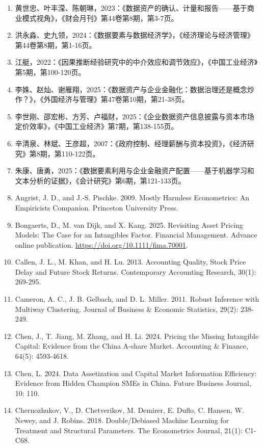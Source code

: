 \begin{enumerate}
\def\labelenumi{\arabic{enumi}.}
\tightlist
\item
  黄世忠、叶丰滢、陈朝琳，2023：《数据资产的确认、计量和报告------基于商业模式视角》，《财会月刊》第44卷第8期，第3-7页。
\item
  洪永淼、史九领，2024：《数据要素与数据经济学》，《经济理论与经济管理》第44卷第8期，第1-16页。
\item
  江艇，2022：《因果推断经验研究中的中介效应和调节效应》，《中国工业经济》第5期，第100-120页。
\item
  李姝、赵灿、谢雁翔，2025：《数据资产与企业金融化：数据治理还是概念炒作？》，《外国经济与管理》第47卷第10期，第21-38页。
\item
  李世刚、邵宏彬、方芳、卢福财，2025：《企业数据资产信息披露与资本市场定价效率》，《中国工业经济》第7期，第138-155页。
\item
  辛清泉、林斌、王彦超，2007：《政府控制、经理薪酬与资本投资》，《经济研究》第8期，第110-122页。
\item
  朱康、唐勇，2025：《数据要素利用与企业金融资产配置------基于机器学习和文本分析的证据》，《会计研究》第6期，第121-133页。
\item
  Angrist, J. D., and J.-S. Pischke. 2009. Mostly Harmless Econometrics: An Empiricist\textquotesingle s Companion. Princeton University Press.
\item
  Bongaerts, D., M. van Dijk, and X. Kang. 2025. Revisiting Asset Pricing Models: The Case for an Intangibles Factor. Financial Management. Advance online publication. \url{https://doi.org/10.1111/fima.70001}.
\item
  Callen, J. L., M. Khan, and H. Lu. 2013. Accounting Quality, Stock Price Delay and Future Stock Returns. Contemporary Accounting Research, 30(1): 269-295.
\item
  Cameron, A. C., J. B. Gelbach, and D. L. Miller. 2011. Robust Inference with Multiway Clustering. Journal of Business \& Economic Statistics, 29(2): 238-249.
\item
  Chen, J., T. Jiang, M. Zhang, and H. Li. 2024. Pricing the Missing Intangible Capital: Evidence from the China A-share Market. Accounting \& Finance, 64(5): 4593-4618.
\item
  Chen, L. 2024. Data Assetization and Capital Market Information Efficiency: Evidence from Hidden Champion SMEs in China. Future Business Journal, 10: 110.
\item
  Chernozhukov, V., D. Chetverikov, M. Demirer, E. Duflo, C. Hansen, W. Newey, and J. Robins. 2018. Double/Debiased Machine Learning for Treatment and Structural Parameters. The Econometrics Journal, 21(1): C1-C68.

\end{enumerate}
